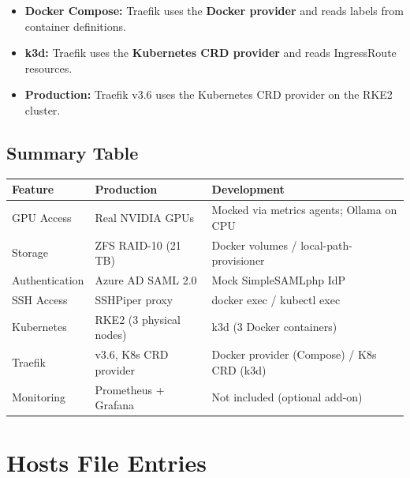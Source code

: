 \documentclass[11pt,a4paper]{article}
\begin{document}
\begin{itemize}[leftmargin=2em]
    \item \textbf{Docker Compose:} Traefik uses the \textbf{Docker provider}
          and reads labels from container definitions.
    \item \textbf{k3d:} Traefik uses the \textbf{Kubernetes CRD provider}
          and reads IngressRoute resources.
    \item \textbf{Production:} Traefik v3.6 uses the Kubernetes CRD
          provider on the RKE2 cluster.
\end{itemize}

\subsection{Summary Table}

\begin{center}
\small
\begin{tabularx}{\textwidth}{l l X}
    \toprule
    \textbf{Feature} & \textbf{Production} & \textbf{Development} \\
    \midrule
    GPU Access & Real NVIDIA GPUs &
        Mocked via metrics agents; Ollama on CPU \\
    \addlinespace
    Storage & ZFS RAID-10 (21 TB) &
        Docker volumes / local-path-provisioner \\
    \addlinespace
    Authentication & Azure AD SAML 2.0 &
        Mock SimpleSAMLphp IdP \\
    \addlinespace
    SSH Access & SSHPiper proxy &
        docker exec / kubectl exec \\
    \addlinespace
    Kubernetes & RKE2 (3 physical nodes) &
        k3d (3 Docker containers) \\
    \addlinespace
    Traefik & v3.6, K8s CRD provider &
        Docker provider (Compose) / K8s CRD (k3d) \\
    \addlinespace
    Monitoring & Prometheus + Grafana &
        Not included (optional add-on) \\
    \bottomrule
\end{tabularx}
\end{center}

\newpage
\appendix

\section{Hosts File Entries}
\label{app:hosts}
\end{document}

